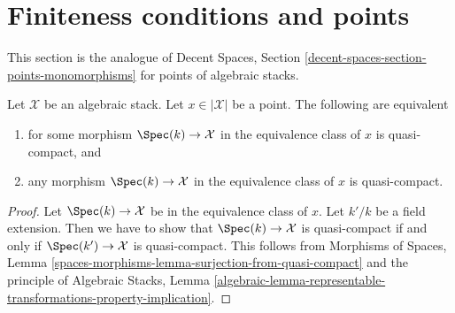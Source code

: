 \section{Finiteness conditions and points}
\label{section-points-conditions}

\noindent
This section is the analogue of
Decent Spaces, Section \ref{decent-spaces-section-points-monomorphisms}
for points of algebraic stacks.

\begin{lemma}
\label{lemma-UR-quasi-compact-above-x}
Let $\mathcal{X}$ be an algebraic stack. Let $x \in |\mathcal{X}|$
be a point. The following are equivalent
\begin{enumerate}
\item for some morphism $\Spec(k) \to \mathcal{X}$ in the equivalence
class of $x$ is quasi-compact, and
\item any morphism $\Spec(k) \to \mathcal{X}$ in the equivalence
class of $x$ is quasi-compact.
\end{enumerate}
\end{lemma}

\begin{proof}
Let $\Spec(k) \to \mathcal{X}$ be in the equivalence
class of $x$. Let $k'/k$ be a field extension.
Then we have to show that $\Spec(k) \to \mathcal{X}$ is
quasi-compact if and only if $\Spec(k') \to \mathcal{X}$
is quasi-compact. This follows from
Morphisms of Spaces, Lemma
\ref{spaces-morphisms-lemma-surjection-from-quasi-compact}
and the principle of Algebraic Stacks, Lemma
\ref{algebraic-lemma-representable-transformations-property-implication}.
\end{proof}










